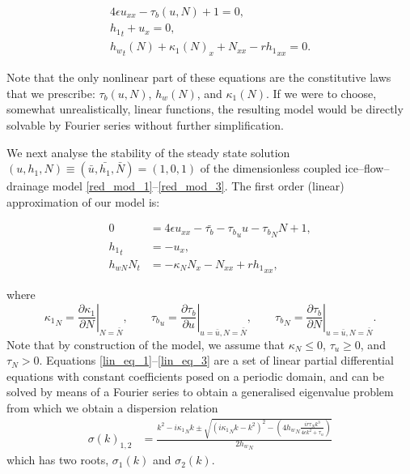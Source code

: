 \documentclass[journal abbreviation, manuscript]{copernicus}
\begin{document}
\begin{subequations}
\begin{align}
4 \epsilon  u_{xx}-\tau_b(u,N) + 1= 0, \label{red_mod_1}\\
 {h_1}_t+ u_x=0 ,\label{red_mod_2} \\
{h_w}_t(N) + \kappa_1(N)_x+  N_{xx} -  r {h_1}_{xx} = 0  .  \label{red_mod_3}
\end{align}
\end{subequations}

Note that the only 
nonlinear part of these equations are the constitutive laws that we 
prescribe: $\tau_b(u,N)$, $ {h_w}(N)$, and $\kappa_1(N)$.
If we were to choose, somewhat unrealistically, linear functions, the
resulting model would be directly solvable by Fourier series without 
further simplification.


We next analyse the 
stability of the steady state solution $(u,h_1,N) \equiv 
(\bar{u},\bar{h_1},\bar{N}) = (1,0,1)$ of the dimensionless coupled 
ice--flow--drainage model \eqref{red_mod_1}--\eqref{red_mod_3}. The first order (linear) approximation of our model is:

\begin{subequations}
\begin{align}
    0 &= 4\epsilon  u_{xx} - \bar{\tau_b} - {\tau_b}_u u - {\tau_b}_N N+ 1,   \label{lin_eq_1}\\
 {h_1}_t &= -  u_{x}, \label{lin_eq_2}\\
  h_{w N} N_t &= - \kappa_N N_x  - N_{xx} + r  {h_1}_{xx} , \label{lin_eq_3}
 \end{align}
\end{subequations}

where
$$ {\kappa_1}_N = \left.\frac{\partial \kappa_1}{\partial N}\right|_{N = 
\bar{N}}, \qquad {\tau_b}_u = \left.\frac{\partial \tau_b}{\partial 
u}\right|_{u = \bar{u}, N = \bar{N}},  \qquad {\tau_b}_N = 
\left.\frac{\partial \tau_b}{\partial N}\right|_{u = \bar{u}, N = 
\bar{N}}. $$
Note that by construction of the model, we assume that $\kappa_N \leq 
0$, $\tau_u \geq 0$, and $\tau_N > 0$.
Equations \eqref{lin_eq_1}--\eqref{lin_eq_3}
are a set of linear partial differential equations with constant 
coefficients posed on a periodic domain, and can be solved by means of a Fourier series to obtain a generalised eigenvalue problem from which we obtain a dispersion relation  
\begin{align}
\sigma(k)_{1,2}&=\frac{k^2-  i {\kappa_1}_N k  \pm \sqrt{( i {\kappa_1}_N k - k^2)^2-(4 {h_w}_N \frac{i r  \tau_N k^3}{ 4\epsilon  k^2 +\tau_u})}}{2{h_w}_N} \label{dispersion_relation}  
 \end{align}  
which has two roots, $\sigma_1(k)$ and $\sigma_2(k)$.
\end{document}
